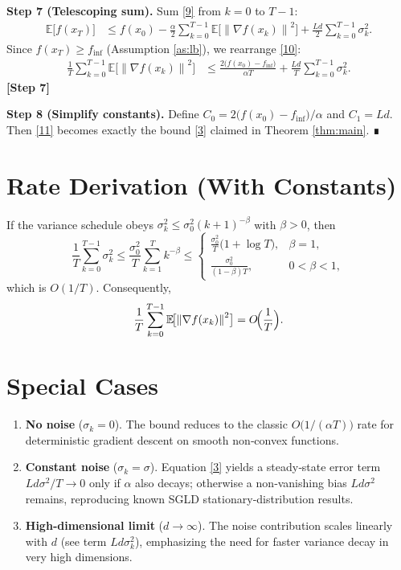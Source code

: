 \documentclass{article}
\newcommand{\E}{\mathbb{E}}
\newcommand{\norm}[1]{\left\lVert#1\right\rVert}
\begin{document}
\bigskip
\noindent\textbf{Step 7 (Telescoping sum).}  
Sum \eqref{9} from $k=0$ to $T-1$:
\begin{align}
\E\!\bigl[f(x_{T})\bigr]
&\le f(x_{0})
-\frac{\alpha}{2}\sum_{k=0}^{T-1}\E\!\bigl[\norm{\nabla f(x_{k})}^{2}\bigr]
+\frac{L d}{2}\sum_{k=0}^{T-1}\sigma_{k}^{2}.
\tag{10}
\end{align}
Since $f(x_{T})\ge f_{\inf}$ (Assumption \ref{as:lb}), we rearrange \eqref{10}:
\begin{align}
\frac{1}{T}\sum_{k=0}^{T-1}\E\!\bigl[\norm{\nabla f(x_{k})}^{2}\bigr]
&\le \frac{2\bigl(f(x_{0})-f_{\inf}\bigr)}{\alpha T}
+\frac{L d}{T}\sum_{k=0}^{T-1}\sigma_{k}^{2}.
\tag{11}
\end{align}
\noindent\textbf{[Step 7]}

\bigskip
\noindent\textbf{Step 8 (Simplify constants).}  
Define $C_{0}=2\bigl(f(x_{0})-f_{\inf}\bigr)/\alpha$ and $C_{1}=L d$. Then \eqref{11} becomes exactly the bound \eqref{3} claimed in Theorem \ref{thm:main}. ∎

\section*{Rate Derivation (With Constants)}
If the variance schedule obeys $\sigma_{k}^{2}\le \sigma_{0}^{2}(k+1)^{-\beta}$ with $\beta>0$, then
\[
\frac{1}{T}\sum_{k=0}^{T-1}\sigma_{k}^{2}
\le \frac{\sigma_{0}^{2}}{T}\sum_{k=1}^{T}k^{-\beta}
\le
\begin{cases}
\displaystyle \frac{\sigma_{0}^{2}}{T}\bigl(1+\log T\bigr) , & \beta=1,\\[6pt]
\displaystyle \frac{\sigma_{0}^{2}}{(1-\beta)T}, & 0<\beta<1,
\end{cases}
\]
which is $O(1/T)$. Consequently,
\[
\frac{1}{T}\sum_{k=0}^{T-1}\E\!\bigl[\norm{\nabla f(x_{k})}^{2}\bigr]
= O\!\Bigl(\frac{1}{T}\Bigr).
\]

\section*{Special Cases}
\begin{enumerate}
\item \textbf{No noise} ($\sigma_{k}=0$). The bound reduces to the classic $O\!\bigl(1/(\alpha T)\bigr)$ rate for deterministic gradient descent on smooth non‑convex functions.
\item \textbf{Constant noise} ($\sigma_{k}=\sigma$). Equation \eqref{3} yields a steady‑state error term $L d\sigma^{2}/T\to 0$ only if $\alpha$ also decays; otherwise a non‑vanishing bias $L d\sigma^{2}$ remains, reproducing known SGLD stationary‑distribution results.
\item \textbf{High‑dimensional limit} ($d\to\infty$). The noise contribution scales linearly with $d$ (see term $L d\sigma_{k}^{2}$), emphasizing the need for faster variance decay in very high dimensions.
\end{enumerate}
\end{document}
